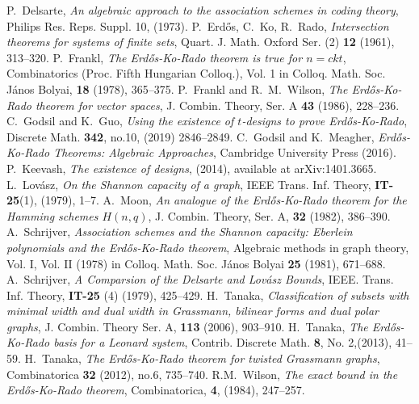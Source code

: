 \documentclass[12pt]{article}
\theoremstyle{definition}
\theoremstyle{remark}
\begin{document}
\begin{thebibliography}{99}
P.~Delsarte, \emph{An algebraic approach to the association schemes in coding theory}, Philips Res. Reps. Suppl. 10, (1973). 
P.~Erd\H{o}s, C.~Ko, R.~Rado, \emph{Intersection theorems for systems of finite sets}, Quart. J. Math. Oxford Ser. (2) {\bf 12} (1961), 313--320.
P.~Frankl, \emph{The Erd\H{o}s-Ko-Rado theorem is true for $n=ckt$}, Combinatorics (Proc. Fifth Hungarian Colloq.), Vol. 1 in Colloq. Math. Soc. J\'anos Bolyai, {\bf 18} (1978), 365--375. 
P.~Frankl and R.~M.~Wilson, \emph{The Erd\H{o}s-Ko-Rado theorem for vector spaces}, J. Combin. Theory, Ser. A {\bf 43} (1986), 228--236. 
C.~Godsil and K.~Guo, \emph{Using the existence of $t$-designs to prove Erd\H{o}s-Ko-Rado}, Discrete Math. {\bf 342}, no.10, (2019) 2846--2849. 
C.~Godsil and K.~Meagher, \emph{Erd\H{o}s-Ko-Rado Theorems: Algebraic Approaches}, Cambridge University Press (2016). 
P.~Keevash, \emph{The existence of designs}, (2014), available at arXiv:1401.3665. 
L.~Lov\'asz, \emph{On the Shannon capacity of a graph}, IEEE Trans. Inf. Theory, {\bf IT-25}(1), (1979), 1--7.
A.~Moon, \emph{An analogue of the Erd\H{o}s-Ko-Rado theorem for the Hamming schemes $H(n, q)$}, J. Combin. Theory, Ser. A, {\bf 32} (1982), 386--390. 
A.~Schrijver, \emph{Association schemes and the Shannon capacity: Eberlein polynomials and the Erd\H{o}s-Ko-Rado theorem}, Algebraic methods in graph theory, Vol. I, Vol. II (1978) in Colloq. Math. Soc. J\'anos Bolyai {\bf 25} (1981), 671--688. 
A.~Schrijver, \emph{A Comparsion of the Delsarte and Lov\'asz Bounds}, IEEE. Trans. Inf. Theory, {\bf IT-25} (4) (1979), 425--429. 
H.~Tanaka, \emph{Classification of subsets with minimal width and dual width in Grassmann, bilinear forms and dual polar graphs}, J. Combin. Theory Ser. A, {\bf 113} (2006), 903--910. 
H.~Tanaka, \emph{The Erd\H{o}s-Ko-Rado basis for a Leonard system}, Contrib. Discrete Math. {\bf 8}, No. 2,(2013), 41--59.
H.~Tanaka, \emph{The Erd\H{o}s-Ko-Rado theorem for twisted Grassmann graphs}, Combinatorica {\bf 32} (2012), no.6, 735--740.
R.M.~Wilson, \emph{The exact bound in the Erd\H{o}s-Ko-Rado theorem}, Combinatorica, {\bf 4}, (1984), 247--257.


\end{thebibliography}
\end{document}
